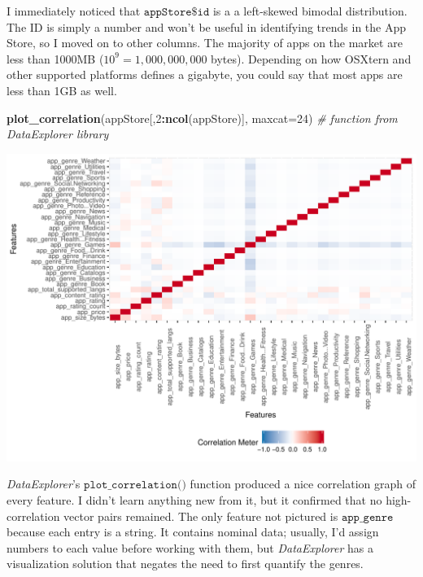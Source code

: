 \documentclass[]{article}
\newenvironment{Shaded}{\begin{snugshade}}{\end{snugshade}}
\newcommand{\KeywordTok}[1]{\textcolor[rgb]{0.13,0.29,0.53}{\textbf{#1}}}
\newcommand{\DataTypeTok}[1]{\textcolor[rgb]{0.13,0.29,0.53}{#1}}
\newcommand{\DecValTok}[1]{\textcolor[rgb]{0.00,0.00,0.81}{#1}}
\newcommand{\CommentTok}[1]{\textcolor[rgb]{0.56,0.35,0.01}{\textit{#1}}}
\newcommand{\OperatorTok}[1]{\textcolor[rgb]{0.81,0.36,0.00}{\textbf{#1}}}
\newcommand{\NormalTok}[1]{#1}
\begin{document}
I immediately noticed that \(\texttt{appStore\$id}\) is a a left-skewed
bimodal distribution. The ID is simply a number and won't be useful in
identifying trends in the App Store, so I moved on to other columns. The
majority of apps on the market are less than 1000MB
(\(10^9 = 1,000,000,000\) bytes). Depending on how OSXtern and other
supported platforms defines a gigabyte, you could say that most apps are
less than 1GB as well.

\begin{Shaded}
\begin{Highlighting}[]
\KeywordTok{plot_correlation}\NormalTok{(appStore[,}\DecValTok{2}\OperatorTok{:}\KeywordTok{ncol}\NormalTok{(appStore)], }\DataTypeTok{maxcat=}\DecValTok{24}\NormalTok{) }\CommentTok{# function from DataExplorer library}
\end{Highlighting}
\end{Shaded}

\begin{center}\includegraphics{Plots/analysis2-1} \end{center}

\emph{DataExplorer}'s \(\texttt{plot\_correlation()}\) function produced
a nice correlation graph of every feature. I didn't learn anything new
from it, but it confirmed that no high-correlation vector pairs
remained. The only feature not pictured is \(\texttt{app\_genre}\)
because each entry is a string. It contains nominal data; usually, I'd
assign numbers to each value before working with them, but
\emph{DataExplorer} has a visualization solution that negates the need
to first quantify the genres.
\end{document}

